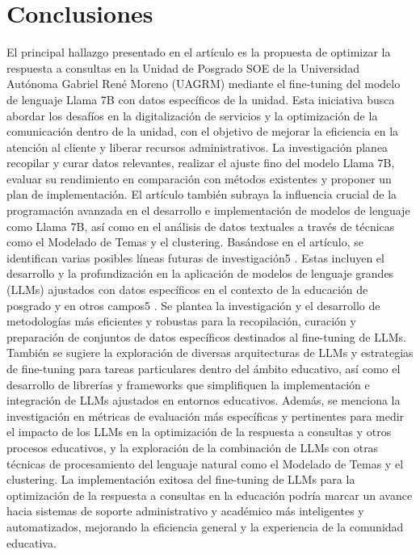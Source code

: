 \documentclass[12pt,twocolumn]{article}
\begin{document}
\section{Conclusiones}
El principal hallazgo presentado en el artículo es la propuesta de optimizar la respuesta a consultas en la Unidad de Posgrado SOE de la Universidad Autónoma Gabriel René Moreno (UAGRM) mediante el fine-tuning del modelo de lenguaje Llama 7B con datos específicos de la unidad. Esta iniciativa busca abordar los desafíos en la digitalización de servicios y la optimización de la comunicación dentro de la unidad, con el objetivo de mejorar la eficiencia en la atención al cliente y liberar recursos administrativos. 
La investigación planea recopilar y curar datos relevantes, realizar el ajuste fino del modelo Llama 7B, evaluar su rendimiento en comparación con métodos existentes y proponer un plan de implementación. El artículo también subraya la influencia crucial de la programación avanzada en el desarrollo e implementación de modelos de lenguaje como Llama 7B, así como en el análisis de datos textuales a través de técnicas como el Modelado de Temas y el clustering.
Basándose en el artículo, se identifican varias posibles líneas futuras de investigación5 . Estas incluyen el desarrollo y la profundización en la aplicación de modelos de lenguaje grandes (LLMs) ajustados con datos específicos en el contexto de la educación de posgrado y en otros campos5 . 
Se plantea la investigación y el desarrollo de metodologías más eficientes y robustas para la recopilación, curación y preparación de conjuntos de datos específicos destinados al fine-tuning de LLMs. 
También se sugiere la exploración de diversas arquitecturas de LLMs y estrategias de fine-tuning para tareas particulares dentro del ámbito educativo, así como el desarrollo de librerías y frameworks que simplifiquen la implementación e integración de LLMs ajustados en entornos educativos. 
Además, se menciona la investigación en métricas de evaluación más específicas y pertinentes para medir el impacto de los LLMs en la optimización de la respuesta a consultas y otros procesos educativos, y la exploración de la combinación de LLMs con otras técnicas de procesamiento del lenguaje natural como el Modelado de Temas y el clustering. 
La implementación exitosa del fine-tuning de LLMs para la optimización de la respuesta a consultas en la educación podría marcar un avance hacia sistemas de soporte administrativo y académico más inteligentes y automatizados, mejorando la eficiencia general y la experiencia de la comunidad educativa.
\end{document}
